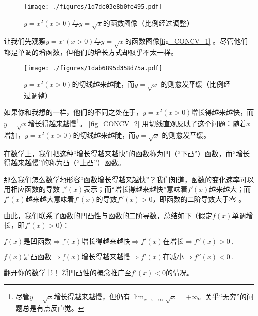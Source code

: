 

\begin{figure}[ht]
\centering
\texttt{[image: ./figures/1d7dc03e8b0fe495.pdf]}
\caption{$y=x^2 (x>0)$与$y=\sqrt{x}$的函数图像（比例经过调整）} \label{fig_CONCV_1}
\end{figure}

让我们先观察$y=x^2 (x>0)$与$y=\sqrt{x}$的函数图像\autoref{fig_CONCV_1} 。尽管他们都是单调的增函数，但他们的增长方式却似乎不太一样。

\begin{figure}[ht]
\centering
\texttt{[image: ./figures/1dab6895d358d75a.pdf]}
\caption{$y=x^2 (x>0)$的切线越来越陡，而$y=\sqrt{x}$ 的则愈发平缓（比例经过调整）} \label{fig_CONCV_2}
\end{figure}

如果你和我想的一样，他们的不同之处在于，$y=x^2 (x>0)$增长得越来越快，而$y=\sqrt{x}$增长得越来越慢\footnote{尽管$y=\sqrt{x}$增长得越来越慢，但仍有 $\lim_{x\to+\infty} \sqrt{x} = +\infty$。关乎“无穷”的问题总是有点反直觉。}。
\autoref{fig_CONCV_2} 用切线直观反映了这个问题：随着$x$增加，$y=x^2 (x>0)$的切线越来越陡，而$y=\sqrt{x}$ 的则愈发平缓。

在数学上，我们把这种“增长得越来越快”的函数称为凹（“下凸”）函数，而“增长得越来越慢”的称为凸（“上凸”）函数。

那么我们怎么数学地形容“函数增长得越来越快”？我们知道，函数的变化速率可以用相应函数的导数  $f'(x)$表示；而“增长得越来越快”意味着$f'(x)$越来越大；而$f'(x)$越来越大意味着$f'(x)$的导数$f''(x)>0$，即函数的二阶导数大于零  。

由此，我们联系了函数的凹凸性与函数的二阶导数，总结如下（假定$f(x)$单调增长，即$f'(x)>0$）：

$f(x)\text{是凹函数} \Rightarrow f(x)\text{增长得越来越快}\Rightarrow f'(x)\text{在增长} \Rightarrow f''(x)>0~,$

$f(x)\text{是凸函数} \Rightarrow f(x)\text{增长得越来越慢}\Rightarrow f'(x)\text{在减小} \Rightarrow f''(x)<0~.$

\begin{exercise}{翻开你的数学书！}
将凹凸性的概念推广至$f'(x)<0$的情况。
\end{exercise}

